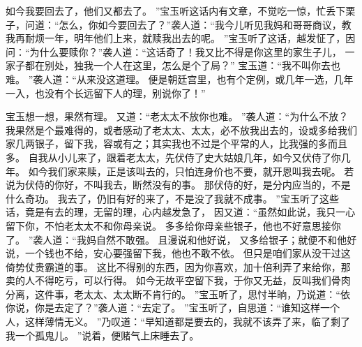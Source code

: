 如今我要回去了，他们又都去了。
”宝玉听这话内有文章，不觉吃一惊，忙丢下栗子，问道：“怎么，你如今要回去了？”袭人道：“我今儿听见我妈和哥哥商议，教我再耐烦一年，明年他们上来，就赎我出去的呢。
”宝玉听了这话，越发怔了，因问：“为什么要赎你？”袭人道：“这话奇了！我又比不得是你这里的家生子儿，
一家子都在别处，独我一个人在这里，怎么是个了局？”
宝玉道：“我不叫你去也难。
”袭人道：“从来没这道理。
便是朝廷宫里，也有个定例，或几年一选，几年一入，也没有个长远留下人的理，别说你了！”\par
宝玉想一想，果然有理。
又道：“老太太不放你也难。
”袭人道：“为什么不放？我果然是个最难得的，或者感动了老太太、太太，必不放我出去的，设或多给我们家几两银子，留下我，容或有之；其实我也不过是个平常的人，比我强的多而且多。
自我从小儿来了，跟着老太太，先伏侍了史大姑娘几年，如今又伏侍了你几年。
如今我们家来赎，正是该叫去的，只怕连身价也不要，就开恩叫我去呢。
若说为伏侍的你好，不叫我去，断然没有的事。
那伏侍的好，是分内应当的，不是什么奇功。
我去了，仍旧有好的来了，不是没了我就不成事。
”宝玉听了这些话，竟是有去的理，无留的理，心内越发急了，
因又道：“虽然如此说，我只一心留下你，不怕老太太不和你母亲说。
多多给你母亲些银子，他也不好意思接你了。
”袭人道：“我妈自然不敢强。
且漫说和他好说，
又多给银子；就便不和他好说，一个钱也不给，安心要强留下我，他也不敢不依。
但只是咱们家从没干过这倚势仗贵霸道的事。
这比不得别的东西，因为你喜欢，加十倍利弄了来给你，那卖的人不得吃亏，可以行得。
如今无故平空留下我，于你又无益，反叫我们骨肉分离，这件事，老太太、太太断不肯行的。
”宝玉听了，思忖半晌，乃说道：“依你说，你是去定了？”袭人道：“去定了。
”宝玉听了，自思道：“谁知这样一个人，这样薄情无义。
”乃叹道：“早知道都是要去的，我就不该弄了来，临了剩了我一个孤鬼儿。
”说着，便赌气上床睡去了。
